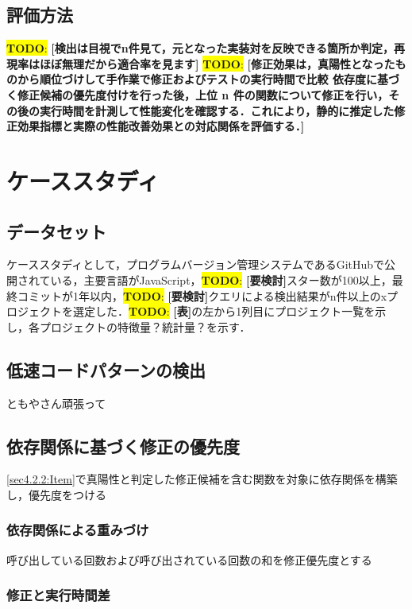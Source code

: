 \documentclass[submit,techrep,noauthor]{ipsj}
\newcommand{\todo}[1]{\colorbox{yellow}{{\bf TODO}:}{\color{red} {\textbf{[#1]}}}}
\begin{document}
\subsection{評価方法}
\todo{検出は目視でn件見て，元となった実装対を反映できる箇所か判定，再現率はほぼ無理だから適合率を見ます}
\todo{修正効果は，真陽性となったものから順位づけして手作業で修正およびテストの実行時間で比較  依存度に基づく修正候補の優先度付けを行った後，上位 n 件の関数について修正を行い，その後の実行時間を計測して性能変化を確認する．これにより，静的に推定した修正効果指標と実際の性能改善効果との対応関係を評価する．}


\section{ケーススタディ}
\label{sec4:format}


\subsection{データセット}

ケーススタディとして，プログラムバージョン管理システムであるGitHubで公開されている，主要言語がJavaScript，\todo{要検討}スター数が100以上，最終コミットが1年以内，\todo{要検討}クエリによる検出結果がn件以上のxプロジェクトを選定した．\todo{表}の左から1列目にプロジェクト一覧を示し，各プロジェクトの特徴量？統計量？を示す．

\subsection{低速コードパターンの検出}
ともやさん頑張って


\subsection{依存関係に基づく修正の優先度}
\label{sec:Item}

\ref{sec4.2.2:Item}で真陽性と判定した修正候補を含む関数を対象に依存関係を構築し，優先度をつける

\subsubsection{依存関係による重みづけ}

呼び出している回数および呼び出されている回数の和を修正優先度とする

\subsubsection{修正と実行時間差}
\end{document}

